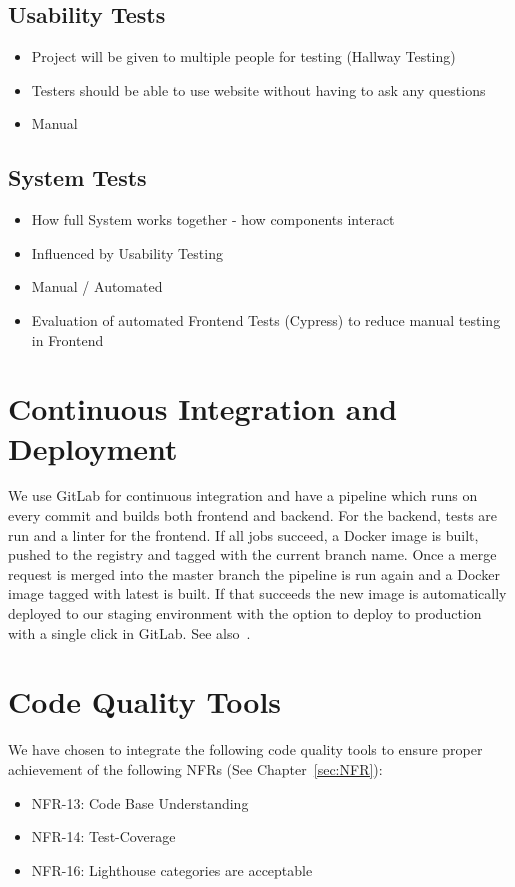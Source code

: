 \subsection{Usability Tests}
\begin{itemize}
    \item Project will be given to multiple people for testing (Hallway Testing)
    \item Testers should be able to use website without having to ask any questions
    \item Manual
\end{itemize}

\subsection{System Tests}
\begin{itemize}
    \item How full System works together - how components interact
    \item Influenced by Usability Testing
    \item Manual / Automated
    \item Evaluation of automated Frontend Tests (Cypress) to reduce manual testing in Frontend
\end{itemize}

\section{Continuous Integration and Deployment}
We use GitLab for continuous integration and have a pipeline which runs on every commit and builds both frontend and backend.
For the backend, tests are run and a linter for the frontend.
If all jobs succeed, a Docker image is built, pushed to the registry and tagged with the current branch name.
Once a merge request is merged into the master branch the pipeline is run again and a Docker image tagged with latest is built.
If that succeeds the new image is automatically deployed to our staging environment with the option to deploy to production with a single click in GitLab.
See also~.

\section{Code Quality Tools}
We have chosen to integrate the following code quality tools to ensure proper achievement of the following NFRs (See Chapter~\ref{sec:NFR}):
\begin{itemize}
    \item NFR-13: Code Base Understanding
    \item NFR-14: Test-Coverage
    \item NFR-16: Lighthouse categories are acceptable
\end{itemize}

